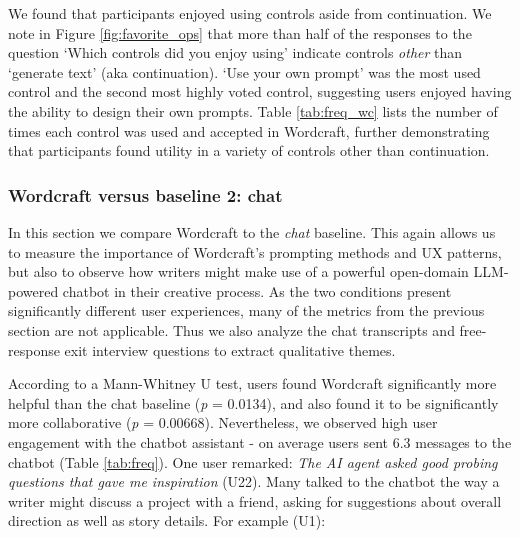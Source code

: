 We found that participants enjoyed using controls aside from continuation.
We note in Figure \ref{fig:favorite_ops} that more than half of the responses to the question `Which controls did you enjoy using' indicate controls \textit{other} than `generate text' (aka continuation). `Use your own prompt' was the most used control and the second most highly voted control, suggesting users enjoyed having the ability to design their own prompts. Table \ref{tab:freq_wc} lists the number of times each control was used and accepted in Wordcraft, further demonstrating that participants found utility in a variety of controls other than continuation. 

\subsubsection{Wordcraft versus baseline 2: chat}
In this section we compare Wordcraft to the \textit{chat} baseline. 
This again allows us to measure the importance of Wordcraft's prompting methods and UX patterns, but also to observe how writers might make use of a powerful open-domain LLM-powered chatbot in their creative process.
As the two conditions present significantly different user experiences, many of the metrics from the previous section are not applicable.
Thus we also analyze the chat transcripts and free-response exit interview questions to extract qualitative themes.

According to a Mann-Whitney U test, users found Wordcraft significantly more helpful than the chat baseline (\textit{p} = 0.0134), and also found it to be significantly more collaborative (\textit{p} = 0.00668).  
Nevertheless, we observed high user engagement with the chatbot assistant - on average users sent 6.3  messages to the chatbot (Table \ref{tab:freq}). One user remarked: \textit{The AI agent asked good probing questions that gave me inspiration} (U22). Many talked to the chatbot the way a writer might discuss a project with a friend, asking for suggestions about overall direction as well as story details. For example (U1):



